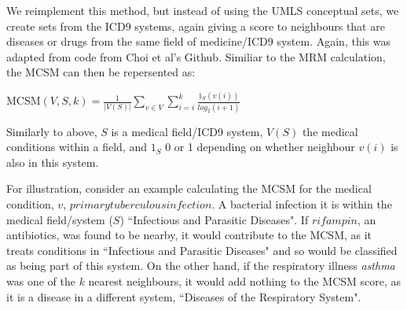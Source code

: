 \documentclass[11pt,a4paper]{article}
\begin{document}
We reimplement this method, but instead of using the UMLS conceptual sets, we create sets from the ICD9 systems, again giving a score to neighbours that are diseases or drugs from the same field of medicine/ICD9 system. Again, this was adapted from code from Choi et al's Github. Similiar to the MRM calculation, the MCSM can then be repersented as:

MCSM$(V,S,k) = \frac{1}{|V(S)|}\sum\limits_{v\in V}\sum\limits_{i=i}^k \frac{1_S(v(i))}{log_2(i+1)}$

Similarly to above, $S$ is a medical field/ICD9 system, $V(S)$ the medical conditions within a field, and $1_S$ 0 or 1 depending on whether neighbour $v(i)$ is also in this system. 

For illustration, consider an example calculating the MCSM for the medical condition, $v$, $primary tuberculous infection$. A bacterial infection it is within the medical field/system ($S$) ``Infectious and Parasitic Diseases". If $rifampin$, an antibiotics, was found to be nearby, it would contribute to the MCSM, as it treats conditions in ``Infectious and Parasitic Diseases" and so would be classified as being part of this system. On the other hand, if the respiratory illness \emph{asthma} was one of the $k$ nearest neighbours, it would add nothing to the MCSM score, as it is a disease in a different system, ``Diseases of the Respiratory System". 





%
\end{document}
